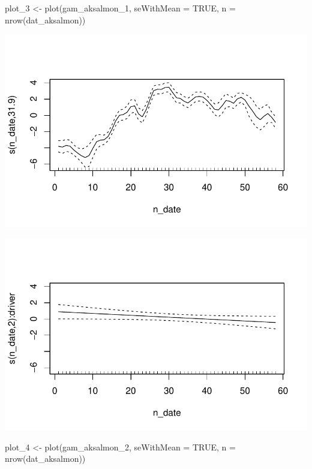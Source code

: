 \documentclass[
  letterpaper,
  DIV=11,
  numbers=noendperiod]{scrartcl}
\newenvironment{Shaded}{\begin{snugshade}}{\end{snugshade}}
\newcommand{\AttributeTok}[1]{\textcolor[rgb]{0.40,0.45,0.13}{#1}}
\newcommand{\ConstantTok}[1]{\textcolor[rgb]{0.56,0.35,0.01}{#1}}
\newcommand{\FunctionTok}[1]{\textcolor[rgb]{0.28,0.35,0.67}{#1}}
\newcommand{\NormalTok}[1]{\textcolor[rgb]{0.00,0.23,0.31}{#1}}
\newcommand{\OtherTok}[1]{\textcolor[rgb]{0.00,0.23,0.31}{#1}}
\begin{document}
\begin{Shaded}
\begin{Highlighting}[]
\NormalTok{plot\_3 }\OtherTok{\textless{}{-}} \FunctionTok{plot}\NormalTok{(gam\_aksalmon\_1, }\AttributeTok{seWithMean =} \ConstantTok{TRUE}\NormalTok{, }\AttributeTok{n =} \FunctionTok{nrow}\NormalTok{(dat\_aksalmon))}
\end{Highlighting}
\end{Shaded}

\includegraphics{dlm_gam_comparison_files/figure-pdf/unnamed-chunk-5-4.pdf}

\includegraphics{dlm_gam_comparison_files/figure-pdf/unnamed-chunk-5-5.pdf}

\begin{Shaded}
\begin{Highlighting}[]
\NormalTok{plot\_4 }\OtherTok{\textless{}{-}} \FunctionTok{plot}\NormalTok{(gam\_aksalmon\_2, }\AttributeTok{seWithMean =} \ConstantTok{TRUE}\NormalTok{, }\AttributeTok{n =} \FunctionTok{nrow}\NormalTok{(dat\_aksalmon))}
\end{Highlighting}
\end{Shaded}
\end{document}
